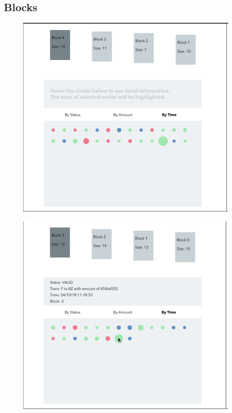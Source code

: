 \documentclass[journal, a4paper]{IEEEtran}
\begin{document}
\subsection{Blocks}

\begin{figure}[!hbt]
		\begin{center}
		\includegraphics[width=\columnwidth]{blocks.png}
		\caption{}
		\label{fig:blocks}
		\end{center}
	\end{figure}
	
\begin{figure}[!hbt]
		\begin{center}
		\includegraphics[width=\columnwidth]{block_hover.png}
		\caption{}
		\label{fig:block_hover}
		\end{center}
	\end{figure}
	
\end{document}
